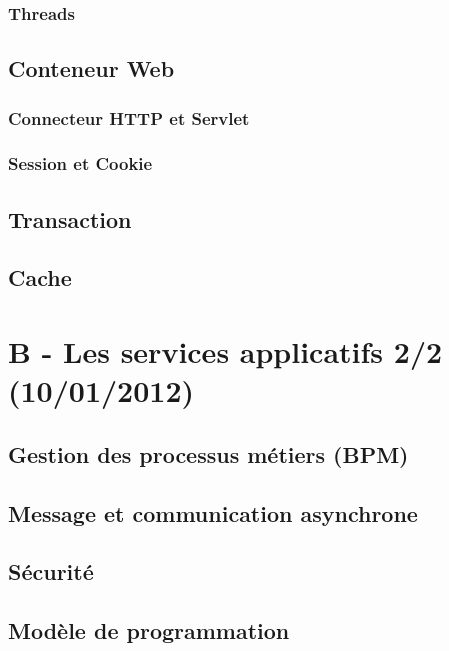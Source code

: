 \subsubsection{Threads}

\subsection{Conteneur Web}
\subsubsection{Connecteur HTTP et Servlet}
\subsubsection{Session et Cookie}

\subsection{Transaction}

\subsection{Cache}

\section{B - Les services applicatifs 2/2 (10/01/2012)}
\subsection{Gestion des processus métiers (BPM)}

\subsection{Message et communication asynchrone}

\subsection{Sécurité}
\subsection{Modèle de programmation}

